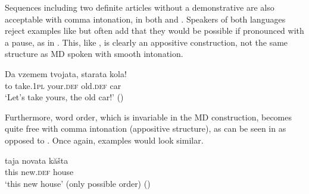 \documentclass[output=paper]{langscibook}
\begin{document}
\noindent Sequences including two definite articles without a demonstrative are also acceptable with comma intonation, in both  and . Speakers of both languages reject examples like  but often add that they would be possible if pronounced with a pause, as in . This, like , is clearly an appositive construction, not the same structure as MD spoken with smooth intonation.


\ex \label{yours2}
\gll Da vzemem tvojata, starata kola!\\
    to take.\textsc{1pl} your.\textsc{def} old.\textsc{def} car\\
\glt `Let's take yours, the old car!' \hfill ()
\z

\noindent Furthermore, word order, which is invariable in the MD construction, becomes quite free with comma intonation (appositive structure), as can be seen in  as opposed to . Once again,  examples would look similar.

\ea \label{house}
\gll taja novata kăšta\\
this new.\textsc{def} house\\
\glt `this new house’ 	(only possible order) \hfill()
\end{document}
